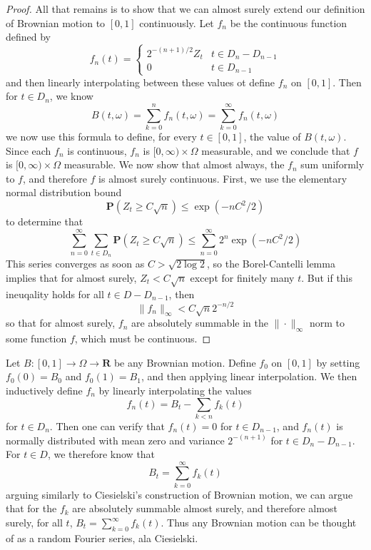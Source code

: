 \begin{proof}
    All that remains is to show that we can almost surely extend our definition of Brownian motion to $[0,1]$ continuously. Let $f_n$ be the continuous function defined by
    \[ f_n(t) = \begin{cases} 2^{-(n+1)/2} Z_t & t \in D_n - D_{n-1} \\ 0 & t \in D_{n-1} \end{cases} \]
    and then linearly interpolating between these values ot define $f_n$ on $[0,1]$. Then for $t \in D_n$, we know
    \[ B(t,\omega) = \sum_{k = 0}^n f_n(t,\omega) = \sum_{k = 0}^\infty f_n(t,\omega) \]
    we now use this formula to define, for every $t \in [0,1]$, the value of $B(t,\omega)$. Since each $f_n$ is continuous, $f_n$ is $[0,\infty) \times \Omega$ measurable, and we conclude that $f$ is $[0,\infty) \times \Omega$ measurable. We now show that almost always, the $f_n$ sum uniformly to $f$, and therefore $f$ is almost surely continuous. First, we use the elementary normal distribution bound
    \[ \mathbf{P}(Z_t \geq C \sqrt{n}) \leq \exp(-nC^2/2) \]
    to determine that
    \[ \sum_{n = 0}^\infty \sum_{t \in D_n} \mathbf{P}(Z_t \geq C\sqrt{n}) \leq \sum_{n = 0}^\infty 2^n \exp(-nC^2/2)\]
    This series converges as soon as $C > \sqrt{2 \log 2}$, so the Borel-Cantelli lemma implies that for almost surely, $Z_t < C \sqrt{n}$ except for finitely many $t$. But if this ineuqality holds for all $t \in D - D_{n-1}$, then
    \[ \| f_n \|_\infty < C\sqrt{n}2^{-n/2} \]
    so that for almost surely, $f_n$ are absolutely summable in the $\| \cdot \|_\infty$ norm to some function $f$, which must be continuous.
\end{proof}

\begin{remark}
    Let $B: [0,1] \to \Omega \to \mathbf{R}$ be any Brownian motion. Define $f_0$ on $[0,1]$ by setting $f_0(0) = B_0$ and $f_0(1) = B_1$, and then applying linear interpolation. We then inductively define $f_n$ by linearly interpolating the values
    \[ f_n(t) = B_t - \sum_{k < n} f_k(t) \]
    for $t \in D_n$. Then one can verify that $f_n(t) = 0$ for $t \in D_{n-1}$, and $f_n(t)$ is normally distributed with mean zero and variance $2^{-(n+1)}$ for $t \in D_n - D_{n-1}$. For $t \in D$, we therefore know that
    \[ B_t = \sum_{k = 0}^\infty f_k(t) \]
    arguing similarly to Ciesielski's construction of Brownian motion, we can argue that for the $f_k$ are absolutely summable almost surely, and therefore almost surely, for all $t$, $B_t = \sum_{k = 0}^\infty f_k(t)$. Thus any Brownian motion can be thought of as a random Fourier series, ala Ciesielski.
\end{remark}

